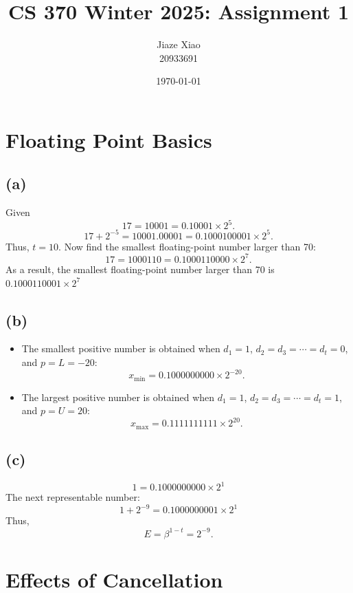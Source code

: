\documentclass{article}
\title{\textbf{CS 370 Winter 2025: Assignment 1}}
\author{Jiaze Xiao \\ 20933691}
\date{\today}
\begin{document}
\maketitle

\section{Floating Point Basics}
\subsection*{(a)}
Given
$$
    17 = 10001 = 0.10001 \times 2^5.
$$
$$
    17 + 2^{-5} = 10001.00001 = 0.1000100001 \times 2^5.
$$
Thus, $t=10$. Now find the smallest floating-point number larger than 70:
$$
    17 = 1000110 = 0.1000110000 \times 2^7.
$$
As a result, the smallest floating-point number larger than 70 is $\boxed{0.1000110001 \times 2^7}$

\subsection*{(b)}
\begin{itemize}
    \item The smallest positive number is obtained when $d_1 = 1$, $d_2 = d_3 = \cdots = d_t = 0$, and $p = L = -20$:
          $$
              x_{\min} = \boxed{0.1000000000 \times 2^{-20}}.
          $$
    \item The largest positive number is obtained when $d_1 = 1$, $d_2 = d_3 = \cdots = d_t = 1$, and $p = U = 20$:
          $$
              x_{\max} = \boxed{0.1111111111 \times 2^{20}}.
          $$
\end{itemize}

\subsection*{(c)}
$$
    1 = 0.1000000000 \times 2^1
$$
The next representable number:
$$
    1 + 2^{-9} = 0.1000000001 \times 2^1
$$
Thus,
$$
    E = \beta^{1-t} = \boxed{2^{-9}}.
$$

\newpage
\section{Effects of Cancellation}
\end{document}
